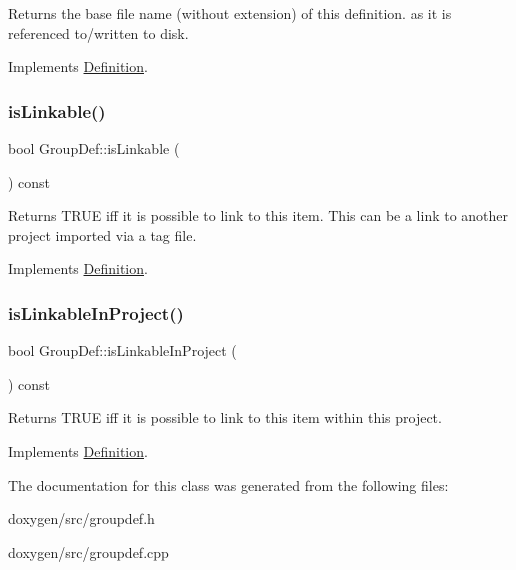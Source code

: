 Returns the base file name (without extension) of this definition. as it is referenced to/written to disk. 

Implements \mbox{\hyperlink{class_definition_acabecdc6bfda2015811eed5f3436322d}{Definition}}.

\mbox{\label{class_group_def_a6aeb6d9849dfceb7809cfbda4bfb2503}} 
\subsubsection{\texorpdfstring{isLinkable()}{isLinkable()}}
{\footnotesize\ttfamily bool Group\+Def\+::is\+Linkable (\begin{DoxyParamCaption}{ }\end{DoxyParamCaption}) const\hspace{0.3cm}{\ttfamily [virtual]}}

Returns T\+R\+UE iff it is possible to link to this item. This can be a link to another project imported via a tag file. 

Implements \mbox{\hyperlink{class_definition_a4002fd79c2d4dcf667c37c83d4214deb}{Definition}}.

\mbox{\label{class_group_def_a916a94699f6234e2bf5594ff12bbf764}} 
\subsubsection{\texorpdfstring{isLinkableInProject()}{isLinkableInProject()}}
{\footnotesize\ttfamily bool Group\+Def\+::is\+Linkable\+In\+Project (\begin{DoxyParamCaption}{ }\end{DoxyParamCaption}) const\hspace{0.3cm}{\ttfamily [virtual]}}

Returns T\+R\+UE iff it is possible to link to this item within this project. 

Implements \mbox{\hyperlink{class_definition_a845891c7206d40c3664b562636cdf9fc}{Definition}}.



The documentation for this class was generated from the following files\+:\begin{DoxyCompactItemize}
\item 
doxygen/src/groupdef.\+h\item 
doxygen/src/groupdef.\+cpp\end{DoxyCompactItemize}

